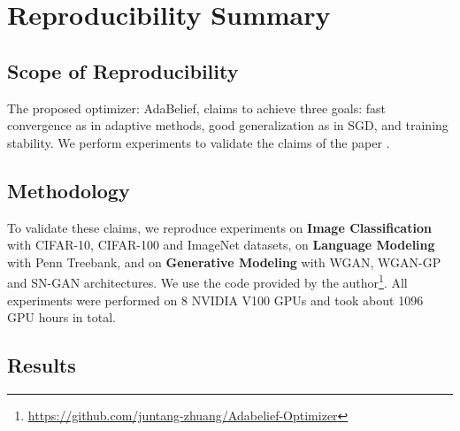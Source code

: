 \section*{\centering Reproducibility Summary}


\subsection*{Scope of Reproducibility}

The proposed optimizer: AdaBelief, claims to achieve three goals: fast convergence as in adaptive methods, good generalization as in SGD, and training stability. We perform experiments to validate the claims of the paper \cite{zhuang_adabelief_2020}.

\subsection*{Methodology}

To validate these claims, we reproduce experiments on \textbf{Image Classification} with CIFAR-10, CIFAR-100 and ImageNet datasets, on \textbf{Language Modeling} with Penn Treebank, and on \textbf{Generative Modeling} with WGAN, WGAN-GP and SN-GAN architectures. We use the code provided by the author\footnote{\href{https://github.com/juntang-zhuang/Adabelief-Optimizer}{https://github.com/juntang-zhuang/Adabelief-Optimizer}}. All experiments were performed on 8 NVIDIA V100 GPUs and took about 1096 GPU hours in total.


\subsection*{Results}


